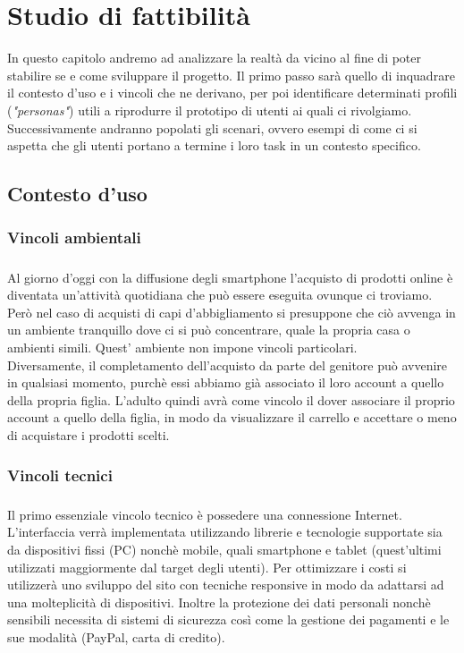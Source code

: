 \documentclass[12pt,a4paper]{report}
\begin{document}
\chapter{Studio di fattibilità}
In questo capitolo andremo ad analizzare la realtà da vicino al fine di poter stabilire se e come sviluppare il progetto. Il primo passo sarà quello di inquadrare il contesto d'uso e i vincoli che ne derivano, per poi identificare determinati profili (\textit{"personas"}) utili a riprodurre il prototipo di utenti ai quali ci rivolgiamo. Successivamente andranno popolati gli scenari, ovvero esempi di come ci si aspetta che gli utenti portano a termine i loro task in un contesto specifico.
\section{Contesto d'uso}
\subsection{Vincoli ambientali}
\paragraph{}Al giorno d'oggi con la diffusione degli smartphone l'acquisto di prodotti online è diventata un'attività quotidiana che può essere eseguita ovunque ci troviamo. Però nel caso di acquisti di capi d'abbigliamento si presuppone che ciò avvenga in un ambiente tranquillo dove ci si può concentrare, quale la propria casa o ambienti simili. Quest' ambiente non impone vincoli particolari.\\
Diversamente, il completamento dell'acquisto da parte del genitore può avvenire in qualsiasi momento, purchè essi abbiamo già associato il loro account a quello della propria figlia. L'adulto quindi avrà come vincolo il dover associare il proprio account a quello della figlia, in modo da visualizzare il carrello e accettare o meno di acquistare i prodotti scelti.
\subsection{Vincoli tecnici}
\paragraph{}Il primo essenziale vincolo tecnico è possedere una connessione Internet. L'interfaccia verrà implementata utilizzando librerie e tecnologie supportate sia da dispositivi fissi (PC) nonchè mobile, quali smartphone e tablet (quest'ultimi utilizzati maggiormente dal target degli utenti). Per ottimizzare i costi si utilizzerà uno sviluppo del sito con tecniche responsive in modo da adattarsi ad una molteplicità di dispositivi. Inoltre la protezione dei dati personali nonchè sensibili necessita di sistemi di sicurezza così come la gestione dei pagamenti e le sue modalità (PayPal, carta di credito).
\end{document}
